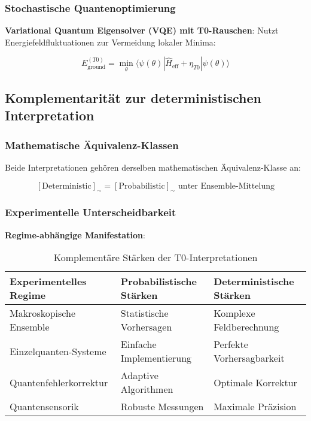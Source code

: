 \documentclass[12pt,a4paper]{article}
\theoremstyle{definition}
\theoremstyle{remark}
\begin{document}
\subsubsection{Stochastische Quantenoptimierung}

\textbf{Variational Quantum Eigensolver (VQE) mit T0-Rauschen}:
Nutzt Energiefeldfluktuationen zur Vermeidung lokaler Minima:

\begin{equation}
	E_{\text{ground}}^{(T0)} = \min_{\theta} \langle \psi(\theta) | \hat{H}_{\text{eff}} + \eta_{T0} | \psi(\theta) \rangle
	\label{eq:vqe_t0}
\end{equation}

\subsection{Komplementarität zur deterministischen Interpretation}

\subsubsection{Mathematische Äquivalenz-Klassen}

Beide Interpretationen gehören derselben mathematischen Äquivalenz-Klasse an:

\begin{equation}
	\boxed{[\text{Deterministic}]_{\sim} = [\text{Probabilistic}]_{\sim} \text{ unter Ensemble-Mittelung}}
	\label{eq:equivalence_class}
\end{equation}

\subsubsection{Experimentelle Unterscheidbarkeit}

\textbf{Regime-abhängige Manifestation}:
\begin{table}[htbp]
	\centering
	\begin{tabular}{|p{4cm}|p{5cm}|p{5cm}|}
		\hline
		\textbf{Experimentelles Regime} & \textbf{Probabilistische Stärken} & \textbf{Deterministische Stärken} \\
		\hline
		Makroskopische Ensemble & Statistische Vorhersagen & Komplexe Feldberechnung \\
		\hline
		Einzelquanten-Systeme & Einfache Implementierung & Perfekte Vorhersagbarkeit \\
		\hline
		Quantenfehlerkorrektur & Adaptive Algorithmen & Optimale Korrektur \\
		\hline
		Quantensensorik & Robuste Messungen & Maximale Präzision \\
		\hline
	\end{tabular}
	\caption{Komplementäre Stärken der T0-Interpretationen}
\end{table}
\end{document}
